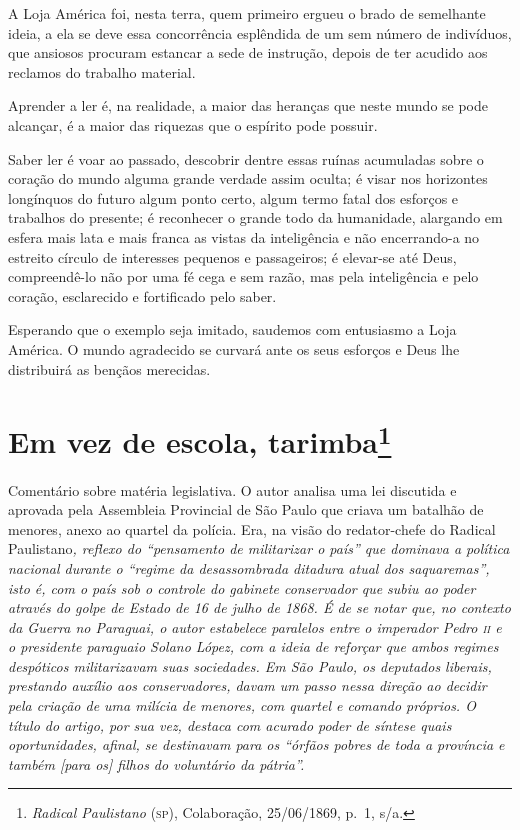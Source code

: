 A Loja América foi, nesta terra, quem primeiro ergueu o brado de
semelhante ideia, a ela se deve essa concorrência esplêndida de um sem
número de indivíduos, que ansiosos procuram estancar a sede de
instrução, depois de ter acudido aos reclamos do trabalho material.

Aprender a ler é, na realidade, a maior das heranças que neste mundo se
pode alcançar, é a maior das riquezas que o espírito pode possuir.

Saber ler é voar ao passado, descobrir dentre essas ruínas acumuladas
sobre o coração do mundo alguma grande verdade assim oculta; é visar nos
horizontes longínquos do futuro algum ponto certo, algum termo fatal dos
esforços e trabalhos do presente; é reconhecer o grande todo da
humanidade, alargando em esfera mais lata e mais franca as vistas da
inteligência e não encerrando-a no estreito círculo de interesses
pequenos e passageiros; é elevar-se até Deus, compreendê-lo não por uma
fé cega e sem razão, mas pela inteligência e pelo coração, esclarecido e
fortificado pelo saber.

Esperando que o exemplo seja imitado, saudemos com entusiasmo a Loja
América. O mundo agradecido se curvará ante os seus esforços e Deus lhe
distribuirá as bençãos merecidas.

\chapter{Em vez de escola, tarimba\footnote{\emph{Radical Paulistano}
  (\textsc{sp}), Colaboração, 25/06/1869, p.~1, s/a.}}

\begin{didascalia}
Comentário sobre matéria legislativa. O autor analisa uma lei discutida
e aprovada pela Assembleia Provincial de São Paulo que criava um
batalhão de menores, anexo ao quartel da polícia. Era, na visão do
redator-chefe do Radical Paulistano\emph{, reflexo do ``pensamento de
militarizar o país'' que dominava a política nacional durante o ``regime
da desassombrada ditadura atual dos saquaremas'', isto é, com o país sob
o controle do gabinete conservador que subiu ao poder através do golpe
de Estado de 16 de julho de 1868. É de se notar que, no contexto da
Guerra no Paraguai, o autor estabelece paralelos entre o imperador Pedro
\textsc{ii} e o presidente paraguaio Solano López, com a ideia de reforçar que
ambos regimes despóticos militarizavam suas sociedades. Em São Paulo, os
deputados liberais, prestando auxílio aos conservadores, davam um passo
nessa direção ao decidir pela criação de uma milícia de menores, com
quartel e comando próprios. O título do artigo, por sua vez, destaca com
acurado poder de síntese quais oportunidades, afinal, se destinavam para
os ``órfãos pobres de toda a província e também {[}para os{]} filhos do
voluntário da pátria''.}
\end{didascalia}

